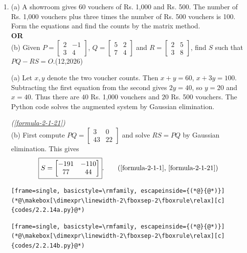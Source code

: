 \begin{enumerate}[label={},font=\normalfont,leftmargin=1.15cm,labelwidth=1.0cm,labelsep=0.15cm,itemindent=0pt,listparindent=0pt,itemsep=\baselineskip,parsep=0pt,topsep=0pt]
\item[2.2.14]
\noindent(a) A showroom gives 60 vouchers of Rs. 1,000 and Rs. 500. The number of Rs. 1,000 vouchers plus three times the number of Rs. 500 vouchers is 100. Form the equations and find the counts by the matrix method.\\
\textbf{OR}\\
\noindent(b) Given $P=\begin{bmatrix}2&-1\\3&4\end{bmatrix}$, $Q=\begin{bmatrix}5&2\\7&4\end{bmatrix}$ and $R=\begin{bmatrix}2&5\\3&8\end{bmatrix}$, find $S$ such that $PQ-RS=O$.\nobreak\hfill\mbox{(12,2026)}



\vspace{0.6em}\par\solution


\noindent(a) Let $x,y$ denote the two voucher counts. Then $x+y=60$, $x+3y=100$. Subtracting the first equation from the second gives $2y=40$, so $y=20$ and $x=40$. Thus there are $\boxed{40}$ Rs. 1,000 vouchers and $\boxed{20}$ Rs. 500 vouchers. The Python code solves the augmented system by Gaussian elimination.\par\noindent\hfill\mbox{\textit{(\ref{formula-2-1-21})}}\\
\noindent(b) First compute $PQ=\begin{bmatrix}3&0\\43&22\end{bmatrix}$ and solve $RS=PQ$ by Gaussian elimination. This gives
\begin{equation*}
\boxed{S=\begin{bmatrix}-191&-110\\77&44\end{bmatrix}}.
\tag*{(\ref{formula-2-1-1}, \ref{formula-2-1-21})}\end{equation*}
\begin{lstlisting}[frame=single, basicstyle=\rmfamily, escapeinside={(*@}{@*)}]
(*@\makebox[\dimexpr\linewidth-2\fboxsep-2\fboxrule\relax][c]{codes/2.2.14a.py}@*)
\end{lstlisting}
\begin{lstlisting}[frame=single, basicstyle=\rmfamily, escapeinside={(*@}{@*)}]
(*@\makebox[\dimexpr\linewidth-2\fboxsep-2\fboxrule\relax][c]{codes/2.2.14b.py}@*)
\end{lstlisting}


\end{enumerate}
